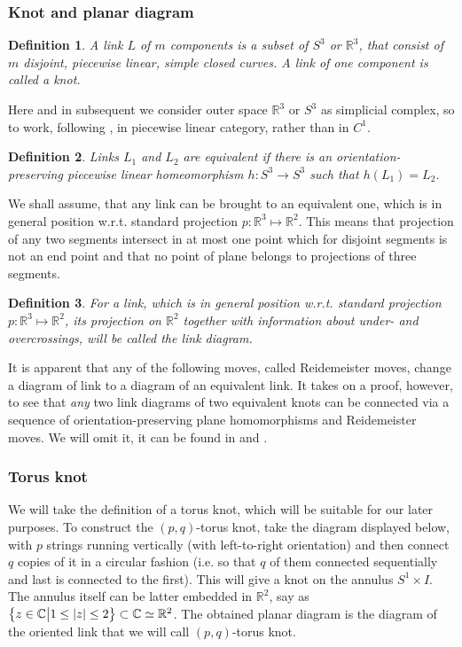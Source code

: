\documentclass[10pt]{article} %
\newtheorem{definition}{Definition}[section]
\theoremstyle{remark}
\begin{document}
\subsubsection{Knot and planar diagram}
\begin{definition}A link $L$ of $m$ components is a subset of $S^3$ or $\mathbb{R}^3$, that consist of $m$ disjoint, piecewise linear, simple
closed curves. A link of one component is called a knot.\end{definition}
Here and in subsequent we consider outer space $\mathbb{R}^3$ or $S^3$ as simplicial complex, so to work, following \cite{lickorish},
in piecewise linear category, rather than in $C^1$.
\begin{definition} Links $L_1$ and $L_2$ are equivalent if there is an orientation-preserving piecewise linear homeomorphism $h:S^3\to S^3$
such that $h(L_1)=L_2$.
\end{definition}
We shall assume, that any link can be brought to an equivalent one, which is in general position w.r.t. standard projection $p:\mathbb{R}^3\mapsto
\mathbb{R}^2$. This means that projection of any two segments intersect in at most one point which for disjoint segments is not an end point
and that no point of plane belongs to projections of three segments.
\begin{definition}
For a link, which is in general position w.r.t. standard projection $p:\mathbb{R}^3\mapsto\mathbb{R}^2$, its projection on $\mathbb{R}^2$
together with information about under- and overcrossings, will be called the link diagram.
\end{definition}
It is apparent that any of the following moves, called Reidemeister moves, change a diagram of link to a diagram of an equivalent link.
It takes on a proof, however, to see that \textit{any} two link diagrams of two equivalent knots can be connected via a sequence of 
orientation-preserving plane homomorphisms and Reidemeister moves. We will omit it, it can be found in \cite{murasugi} and 
\cite[Appendix A]{kawauchi}.
\subsubsection{Torus knot}
We will take the definition of a torus knot, which will be suitable for our later purposes. To construct the $(p,q)$-torus knot, take the diagram
displayed below, with $p$ strings running vertically (with left-to-right orientation)
and then connect $q$ copies of it in a circular fashion (i.e. so that $q$ of them connected
sequentially and last is connected to the first). This will give a knot on the annulus $S^1\times I$. The annulus itself can be latter
embedded in $\mathbb{R}^2$, say as $\left\{z\in\mathbb{C}\big| 1\leq\left|z\right|\leq2\right\}\subset\mathbb{C}\simeq\mathbb{R}^2$. The obtained
planar diagram is the diagram of the oriented link that we will call $(p,q)$-torus knot.
\end{document}
